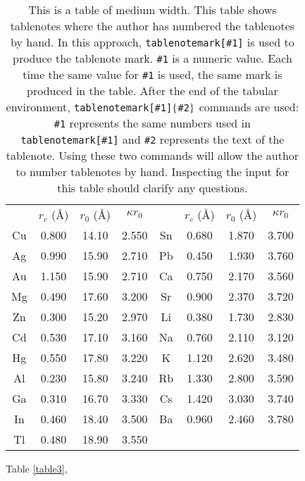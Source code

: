 \documentclass[prb]{revtex4}
\makeatletter
\def\btt#1{\texttt{\@backslashchar#1}}%
\makeatother
\begin{document}
\begin{table}
\caption{This is a table of medium width.
This table shows tablenotes where the author has numbered the tablenotes
by hand. In this approach, \btt{tablenotemark[\#1]} is used to produce the
tablenote mark. {\tt\#1} is a numeric value. Each time the same value
for {\tt\#1} is used,
the same mark is produced in the table. After the end of the tabular
environment,  \btt{tablenotemark[\#1]$\tt\{$\#2$\tt\}$}  commands are used:
 {\tt\#1} represents the same numbers used in \btt{tablenotemark[\#1]}
and {\tt\#2} represents the text of the tablenote. Using these two commands
will allow the author to number tablenotes by hand.
 Inspecting the input for this table should clarify any questions.
\label{table2}}
\begin{tabular}{cccccccc}
 &$r_c$ (\AA)&$r_0$ (\AA)&$\kappa r_0$&
 &$r_c$ (\AA) &$r_0$ (\AA)&$\kappa r_0$\\
\colrule
Cu& 0.800 & 14.10 & 2.550 &Sn\footnotemark[1]
& 0.680 & 1.870 & 3.700 \\
Ag& 0.990 & 15.90 & 2.710 &Pb\footnotemark[2]
& 0.450 & 1.930 & 3.760 \\
Au& 1.150 & 15.90 & 2.710 &Ca\footnotemark[3]
& 0.750 & 2.170 & 3.560 \\
Mg& 0.490 & 17.60 & 3.200 &Sr\footnotemark[4]
& 0.900 & 2.370 & 3.720 \\
Zn& 0.300 & 15.20 & 2.970 &Li\footnotemark[2]
& 0.380 & 1.730 & 2.830 \\
Cd& 0.530 & 17.10 & 3.160 &Na\footnotemark[5]
& 0.760 & 2.110 & 3.120 \\
Hg& 0.550 & 17.80 & 3.220 &K\footnotemark[5]
&  1.120 & 2.620 & 3.480 \\
Al& 0.230 & 15.80 & 3.240 &Rb\footnotemark[3]
& 1.330 & 2.800 & 3.590 \\
Ga& 0.310 & 16.70 & 3.330 &Cs\footnotemark[4]
& 1.420 & 3.030 & 3.740 \\
In& 0.460 & 18.40 & 3.500 &Ba\footnotemark[5]
& 0.960 & 2.460 & 3.780 \\
Tl& 0.480 & 18.90 & 3.550 & & & & \\
\end{tabular}
\end{table}
Table \ref{table3},%
\end{document}
